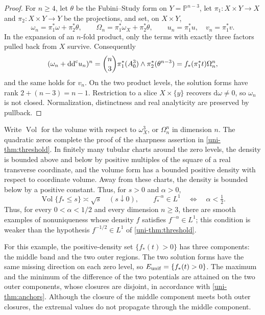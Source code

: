 \begin{proof}
For $n\geq4$, let $\theta$ be the Fubini--Study form on
$Y=\mathbb{P}^{n-3}$, let $\pi_1\colon X\times Y\to X$ and $\pi_2\colon X\times Y\to Y$ be the projections, and set, on $X\times Y$,
\[
 \omega_n=\pi_1^*\omega+\pi_2^*\theta,\qquad
 \Omega_n=\pi_1^*\omega_X+\pi_2^*\theta,\qquad
 u_n=\pi_1^*u,\quad v_n=\pi_1^*v.
\]
In the expansion of an $n$-fold product, only the terms with exactly three factors pulled back from $X$
survive.  Consequently
\[
 (\omega_n+\mathrm{dd}^{\mathrm{c}} u_n)^n
 =\binom n3\pi_1^*(A_0^3)\wedge\pi_2^*(\theta^{n-3})
 =f_*(\pi_1^*t)\Omega_n^n,
\]
and the same holds for $v_n$.  On the two product
levels, the solution forms have rank $2+(n-3)=n-1$.  Restriction to a slice $X\times\{y\}$ recovers
$\mathrm{d}\omega\ne0$, so $\omega_n$ is not closed.  Normalization,
distinctness and real analyticity are preserved by pullback.
\end{proof}

Write $\operatorname{Vol}$ for the volume with respect to $\omega_X^3$, or $\Omega_n^n$ in dimension $n$. The quadratic zeros complete the proof of the sharpness assertion in
\cref{uni-thm:threshold}.  In finitely many tubular charts around the zero levels, the density
is bounded above and below by positive multiples of the square of a real
transverse coordinate, and the volume form has a bounded positive
density with respect to coordinate volume.  Away from these charts, the density is bounded below by a positive constant.  Thus, for $s>0$ and $\alpha>0$,
\begin{equation}\label{uni-eq:sharp-asymptotic}
 \operatorname{Vol}\{f_*\leq s\}\asymp\sqrt s\quad(s\downarrow0),
 \qquad f_*^{-\alpha}\in L^1\quad\Longleftrightarrow\quad\alpha<\tfrac12.
\end{equation}
Thus, for every $0<\alpha<1/2$ and every dimension $n\geq3$, there are smooth examples of nonuniqueness whose density $f$ satisfies $f^{-\alpha}\in L^1$; this condition is weaker than the hypothesis $f^{-1/2}\in L^1$ of \cref{uni-thm:threshold}.

\begin{remark}
For this example, the positive-density set $\{f_*(t)>0\}$ has three components: the middle band and the two outer regions. The two solution forms have the same missing direction on each zero level, so $E_{\rm unif}=\{f_*(t)>0\}$. The maximum and the minimum of the difference of the two potentials are attained on the two outer components, whose closures are disjoint, in accordance with \cref{uni-thm:anchors}. Although the closure of the middle component meets both outer closures, the extremal values do not propagate through the middle component.
\end{remark}
